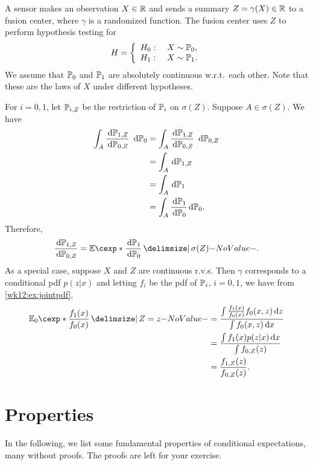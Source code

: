 \documentclass[12pt]{article}
\begin{document}
\begin{Example}
A sensor makes an observation $X \in \mathbb{R}$ and sends a summary $Z = \gamma(X) \in \mathbb{R}$ to a fusion center, where $\gamma$ is a randomized function. The fusion center uses $Z$ to perform hypothesis testing for
\begin{align*}
H=\left\{
\begin{array}{ll}
H_0:\ &X\sim \P_0, \\
H_1:\ &X\sim \P_1.
\end{array}
\right.
\end{align*} 
We assume that $\P_0$ and $\P_1$ are absolutely continuous w.r.t.\ each other. Note that these are the laws of $X$ under different hypotheses.

For $i=0,1$, let $\P_{i,Z}$ be the restriction of $\P_i$ on $\sigma(Z)$. Suppose $A\in \sigma(Z)$. We have 
\begin{align*}
\int_A \frac{\ud \P_{1,Z}}{\ud \P_{0,Z}}\ \ud \P_0&=\int_A \frac{\ud \P_{1,Z}}{\ud \P_{0,Z}}\ \ud \P_{0,Z} \\
&= \int _A \ud \P_{1,Z}\\
&= \int_A \ud \P_1 \\
&= \int_A \frac{\ud \P_1}{\ud \P_0 }\ud \P_0.
\end{align*}
Therefore,
\begin{align*}
\frac{\ud \P_{1,Z}}{\ud \P_{0,Z}}=\E[\frac{\ud \P_1 }{\ud \P_0 } \given \sigma(Z)].
\end{align*}
As a special case, suppose $X$ and $Z$ are continuous r.v.s. Then $\gamma$ corresponds to a conditional pdf $p(z|x)$ and letting $f_i$ be the pdf of $\P_i$, $i=0,1$, we have from \cref{wk12:ex:jointpdf},
\begin{align*}
\E_{0}[\frac{f_1(x)}{f_0(x)} \given Z=z] 
&=\frac{\int \frac{f_1(x)}{f_0(x)} f_0(x,z)\ud z}{\int f_0(x,z)\ud x}\\
&=\frac{\int {f_1(x)} p(z|x)\ud x}{\int f_{0,Z}(z)}\\
&=\frac{ f_{1,Z}(z)}{ f_{0,Z}(z)}.
\end{align*}
\end{Example}


\section{Properties}
In the following, we list some fundamental properties of conditional expectations, many without proofs. The proofs are left for your exercise.
\end{document}

